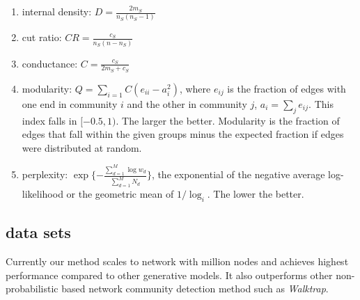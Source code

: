 \documentclass{article}
\begin{document}
\begin{enumerate}
	\item internal density: $D = \frac{2m_S}{n_S(n_S-1)}$
	\item cut ratio: $CR = \frac{c_S}{n_S(n-n_S)}$
	\item conductance: $C = \frac{c_S}{2m_S+c_S}$
	\item modularity: $Q = \sum\limits_{i=1}{C}(e_{ii}-a_i^2)$, where $e_{ij}$ is the fraction of edges with one end in community $i$ and the other in community $j$, $a_i = \sum_je_{ij}$. This index falls in $[-0.5, 1)$. The larger the better. Modularity is the fraction of edges that fall within the given groups minus the expected fraction if edges were distributed at random.
	\item perplexity: $\exp\{-\frac{\sum\limits_{d=1}^{M}\log{w_d}}{\sum\limits_{d=1}^{M}N_d}\}$, the exponential of the negative average log-likelihood or the geometric mean of $1/\log_i$. The lower the better.
\end{enumerate}

\subsection{data sets}
Currently our method scales to network with million nodes and achieves highest performance compared to other generative models. It also outperforms other non-probabilistic based network community detection method such as \textit{Walktrap}.
\end{document}
